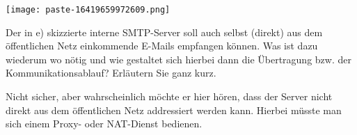\documentclass{article}
\begin{document}
\begin{tcolorbox}[colback=white!10!white,colframe=lightgray!75!black,
  savelowerto=\jobname_ex.tex,breakable,enhanced,lines before break=40]

\justifying
\begin{center}
\texttt{[image: paste-16419659972609.png]}
\end{center}
Der in e) skizzierte interne SMTP-Server soll auch selbst (direkt) aus dem öffentlichen Netz einkommende E-Mails empfangen können. Was ist dazu wiederum wo nötig und wie gestaltet sich hierbei dann die Übertragung bzw. der Kommunikationsablauf? Erläutern Sie ganz kurz.

\tcblower

\justifying
Nicht sicher, aber wahrscheinlich möchte er hier hören, dass der Server nicht direkt aus dem öffentlichen Netz addressiert werden kann. Hierbei müsste man sich einem Proxy- oder NAT-Dienst bedienen.
\end{tcolorbox}
\end{document}
